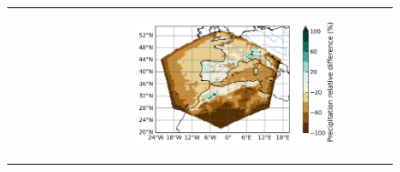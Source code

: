 \begin{figure}[htbp]
\begin{tabular}{ccc}
\begin{subfigure}[b]{0.33\textwidth}
        \end{subfigure} &
        \begin{subfigure}[b]{0.33\textwidth}
            \caption{}
            \includegraphics[width=\textwidth]{images/chap4/domain_size/rel_diff_map_precip_era_LAM_2000km_NBP80.png}
        \end{subfigure} \\
        

\end{tabular}
\end{figure}
